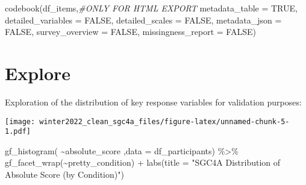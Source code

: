 \documentclass[
]{article}
\newenvironment{Shaded}{\begin{snugshade}}{\end{snugshade}}
\newcommand{\AttributeTok}[1]{\textcolor[rgb]{0.77,0.63,0.00}{#1}}
\newcommand{\CommentTok}[1]{\textcolor[rgb]{0.56,0.35,0.01}{\textit{#1}}}
\newcommand{\ConstantTok}[1]{\textcolor[rgb]{0.00,0.00,0.00}{#1}}
\newcommand{\FunctionTok}[1]{\textcolor[rgb]{0.00,0.00,0.00}{#1}}
\newcommand{\NormalTok}[1]{#1}
\newcommand{\SpecialCharTok}[1]{\textcolor[rgb]{0.00,0.00,0.00}{#1}}
\newcommand{\StringTok}[1]{\textcolor[rgb]{0.31,0.60,0.02}{#1}}
\begin{document}
\begin{Shaded}
\begin{Highlighting}[]
\FunctionTok{codebook}\NormalTok{(df\_items,}\CommentTok{\#ONLY FOR HTML EXPORT}
         \AttributeTok{metadata\_table =} \ConstantTok{TRUE}\NormalTok{,}
         \AttributeTok{detailed\_variables =} \ConstantTok{FALSE}\NormalTok{,}
         \AttributeTok{detailed\_scales =} \ConstantTok{FALSE}\NormalTok{,}
         \AttributeTok{metadata\_json =} \ConstantTok{FALSE}\NormalTok{,}
         \AttributeTok{survey\_overview =} \ConstantTok{FALSE}\NormalTok{,}
         \AttributeTok{missingness\_report =} \ConstantTok{FALSE}\NormalTok{)}
\end{Highlighting}
\end{Shaded}

\hypertarget{explore}{%
\section{Explore}\label{explore}}

Exploration of the distribution of key response variables for validation
purposes:

\begin{Shaded}
\end{Shaded}

\texttt{[image: winter2022\_clean\_sgc4a\_files/figure-latex/unnamed-chunk-5-1.pdf]}

\begin{Shaded}
\begin{Highlighting}[]
\FunctionTok{gf\_histogram}\NormalTok{( }\SpecialCharTok{\textasciitilde{}}\NormalTok{absolute\_score ,}\AttributeTok{data =}\NormalTok{ df\_participants) }\SpecialCharTok{\%\textgreater{}\%} 
  \FunctionTok{gf\_facet\_wrap}\NormalTok{(}\SpecialCharTok{\textasciitilde{}}\NormalTok{pretty\_condition) }\SpecialCharTok{+}
  \FunctionTok{labs}\NormalTok{(}\AttributeTok{title =} \StringTok{"SGC4A Distribution of Absolute Score (by Condition)"}\NormalTok{)}
\end{Highlighting}
\end{Shaded}
\end{document}
